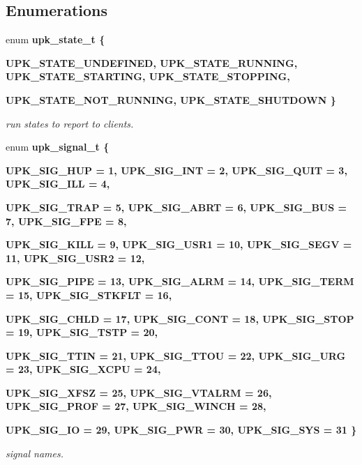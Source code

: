 \subsection*{Enumerations}
\begin{CompactItemize}
\item 
enum \bf{upk\_\-state\_\-t} \{ \par
\bf{UPK\_\-STATE\_\-UNDEFINED}, 
\bf{UPK\_\-STATE\_\-RUNNING}, 
\bf{UPK\_\-STATE\_\-STARTING}, 
\bf{UPK\_\-STATE\_\-STOPPING}, 
\par
\bf{UPK\_\-STATE\_\-NOT\_\-RUNNING}, 
\bf{UPK\_\-STATE\_\-SHUTDOWN}
 \}
\begin{CompactList}\small\item\em run states to report to clients. \item\end{CompactList}\item 
enum \bf{upk\_\-signal\_\-t} \{ \par
\bf{UPK\_\-SIG\_\-HUP} =  1, 
\bf{UPK\_\-SIG\_\-INT} =  2, 
\bf{UPK\_\-SIG\_\-QUIT} =  3, 
\bf{UPK\_\-SIG\_\-ILL} =  4, 
\par
\bf{UPK\_\-SIG\_\-TRAP} =  5, 
\bf{UPK\_\-SIG\_\-ABRT} =  6, 
\bf{UPK\_\-SIG\_\-BUS} =  7, 
\bf{UPK\_\-SIG\_\-FPE} =  8, 
\par
\bf{UPK\_\-SIG\_\-KILL} =  9, 
\bf{UPK\_\-SIG\_\-USR1} =  10, 
\bf{UPK\_\-SIG\_\-SEGV} =  11, 
\bf{UPK\_\-SIG\_\-USR2} =  12, 
\par
\bf{UPK\_\-SIG\_\-PIPE} =  13, 
\bf{UPK\_\-SIG\_\-ALRM} =  14, 
\bf{UPK\_\-SIG\_\-TERM} =  15, 
\bf{UPK\_\-SIG\_\-STKFLT} =  16, 
\par
\bf{UPK\_\-SIG\_\-CHLD} =  17, 
\bf{UPK\_\-SIG\_\-CONT} =  18, 
\bf{UPK\_\-SIG\_\-STOP} =  19, 
\bf{UPK\_\-SIG\_\-TSTP} =  20, 
\par
\bf{UPK\_\-SIG\_\-TTIN} =  21, 
\bf{UPK\_\-SIG\_\-TTOU} =  22, 
\bf{UPK\_\-SIG\_\-URG} =  23, 
\bf{UPK\_\-SIG\_\-XCPU} =  24, 
\par
\bf{UPK\_\-SIG\_\-XFSZ} =  25, 
\bf{UPK\_\-SIG\_\-VTALRM} =  26, 
\bf{UPK\_\-SIG\_\-PROF} =  27, 
\bf{UPK\_\-SIG\_\-WINCH} =  28, 
\par
\bf{UPK\_\-SIG\_\-IO} =  29, 
\bf{UPK\_\-SIG\_\-PWR} =  30, 
\bf{UPK\_\-SIG\_\-SYS} =  31
 \}
\begin{CompactList}\small\item\em signal names. \item\end{CompactList}\end{CompactItemize}


